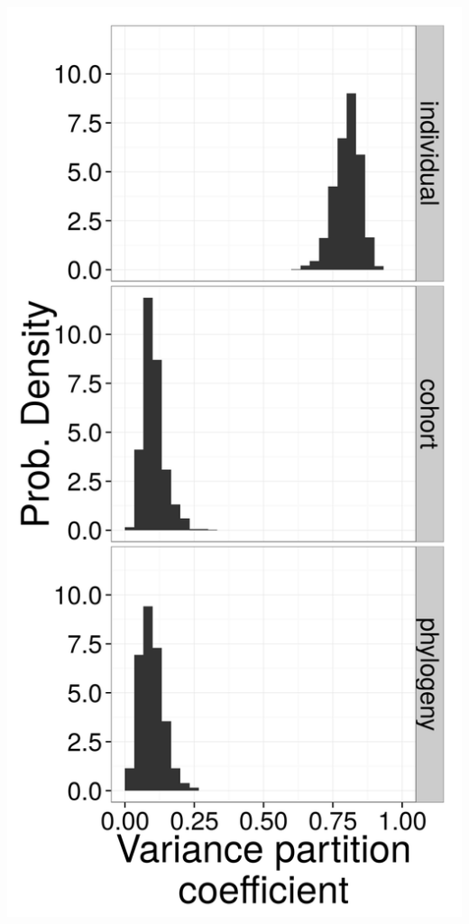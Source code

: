 \documentclass{beamer}
\begin{document}
\begin{frame}
\begin{columns}
\begin{column}{0.5\textwidth}
      \includegraphics[width=\textwidth,height=0.8\textheight,keepaspectratio=true]{figure/variance_est}
    \end{column}
  \end{columns}
  
  \tiny{}
\end{frame}
\end{document}
